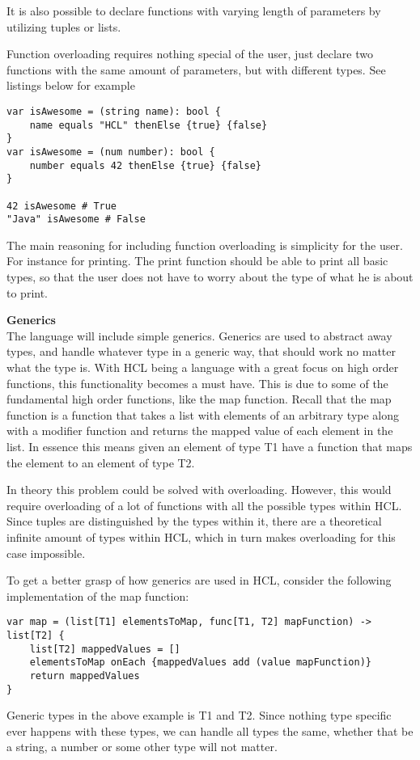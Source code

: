 It is also possible to declare functions with varying length of parameters by utilizing tuples or lists.

Function overloading requires nothing special of the user, just declare two functions with the same amount of parameters, but with different types. 
See listings below for example

\begin{lstlisting}
var isAwesome = (string name): bool {
	name equals "HCL" thenElse {true} {false}
}
var isAwesome = (num number): bool {
	number equals 42 thenElse {true} {false}
}

42 isAwesome # True
"Java" isAwesome # False
\end{lstlisting}

The main reasoning for including function overloading is simplicity for the user.
For instance for printing. 
The print function should be able to print all basic types, so that the user does not have to worry about the type of what he is about to print.


\textbf{Generics}\\
The language will include simple generics.
Generics are used to abstract away types, and handle whatever type in a generic way, that should work no matter what the type is.
With HCL being a language with a great focus on high order functions, this functionality becomes a must have.
This is due to some of the fundamental high order functions, like the map function.
Recall that the map function is a function that takes a list with elements of an arbitrary type along with a modifier function and returns the mapped value of each element in the list.
In essence this means given an element of type T1 have a function that maps the element to an element of type T2.

In theory this problem could be solved with overloading. 
However, this would require overloading of a lot of functions with all the possible types within HCL. 
Since tuples are distinguished by the types within it, there are a theoretical infinite amount of types within HCL, which in turn makes overloading for this case impossible.

To get a better grasp of how generics are used in HCL, consider the following implementation of the map function:
\begin{lstlisting}
var map = (list[T1] elementsToMap, func[T1, T2] mapFunction) -> list[T2] {
	list[T2] mappedValues = []
	elementsToMap onEach {mappedValues add (value mapFunction)}
	return mappedValues
}
\end{lstlisting}

Generic types in the above example is T1 and T2. 
Since nothing type specific ever happens with these types, we can handle all types the same, whether that be a string, a number or some other type will not matter.